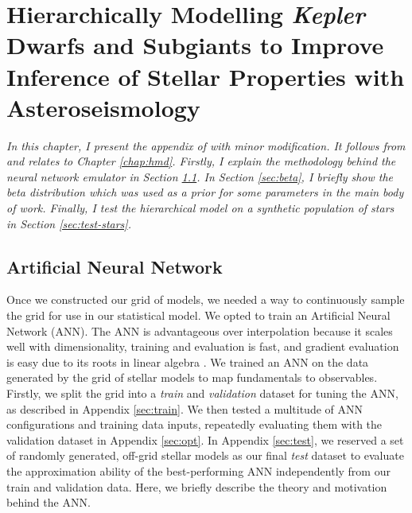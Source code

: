 %
%
%
%
%
\chapter[Hierarchically Modelling Dwarf and Subgiant Stars]{Hierarchically Modelling \emph{Kepler} Dwarfs and Subgiants to Improve Inference of Stellar Properties with Asteroseismology}\label{apx:hmd}

\textit{%
    In this chapter, I present the appendix of \citet{Lyttle.Davies.ea2021} with minor modification. It follows from and relates to Chapter \ref{chap:hmd}. Firstly, I explain the methodology behind the neural network emulator in Section \ref{sec:ann}. In Section \ref{sec:beta}, I briefly show the beta distribution which was used as a prior for some parameters in the main body of work. Finally, I test the hierarchical model on a synthetic population of stars in Section \ref{sec:test-stars}.
}

\section{Artificial Neural Network}\label{sec:ann}



Once we constructed our grid of models, we needed a way to continuously sample the grid for use in our statistical model. We opted to train an Artificial Neural Network (ANN). The ANN is advantageous over interpolation because it scales well with dimensionality, training and evaluation is fast, and gradient evaluation is easy due to its roots in linear algebra \citep{Haykin2007}. We trained an ANN on the data generated by the grid of stellar models to map fundamentals to observables. Firstly, we split the grid into a \emph{train} and \emph{validation} dataset for tuning the ANN, as described in Appendix \ref{sec:train}. We then tested a multitude of ANN configurations and training data inputs, repeatedly evaluating them with the validation dataset in Appendix \ref{sec:opt}. In Appendix \ref{sec:test}, we reserved a set of randomly generated, off-grid stellar models as our final \emph{test} dataset to evaluate the approximation ability of the best-performing ANN independently from our train and validation data. Here, we briefly describe the theory and motivation behind the ANN.


